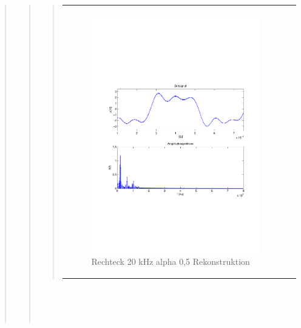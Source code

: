 \begin{quote}
\begin{quote}
\begin{quote}
\begin{center}
\begin{tabular}{ll}
                \begin{minipage}{0.6\textwidth}
                    \begin{figure}[H]
                        \includegraphics[scale=0.55, trim = 16mm 70mm 16mm 85mm, clip]{Bilder/shaperec20_05}
                       \caption{Rechteck 20 kHz alpha 0,5 Rekonstruktion}
		              \label{fig:shaperec20_05}
                    \end{figure}
                \end{minipage}
            
            \end{tabular}
            \end{center}
            
        \end{quote}
        \ \\
        \ \\
        \ \\
            

\end{quote}
\end{quote}
